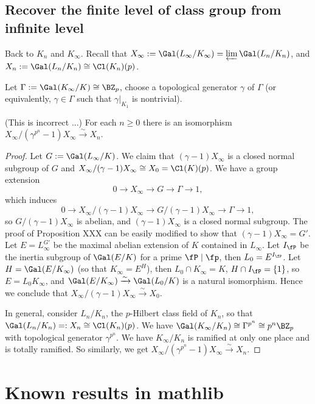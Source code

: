 \subsection{Recover the finite level of class group from infinite level}

Back to $K_n$ and $K_\infty$.
Recall that $X_\infty:=\Gal(L_\infty/K_\infty)=\varprojlim\Gal(L_n/K_n)$,
and $X_n:=\Gal(L_n/K_n)\cong\Cl(K_n)(p)$.

Let $\Gamma:=\Gal(K_\infty/K)\cong\BZ_p$, choose a topological
generator $\gamma$ of $\Gamma$ (or equivalently, $\gamma\in\Gamma$
such that $\gamma|_{K_1}$ is nontrivial).

\begin{prop}
\label{X-inf-coinv-is-X-n}
(This is incorrect ...)
For each $n\geq 0$ there is an isomorphism
$X_\infty/(\gamma^{p^n}-1)X_\infty\xrightarrow\sim
X_n$.
\end{prop}

\begin{proof}
Let $G:=\Gal(L_\infty/K)$.
We claim that $(\gamma-1)X_\infty$ is a closed normal subgroup of $G$
and $X_\infty/(\gamma-1)X_\infty\cong X_0=\Cl(K)(p)$. We have a group extension
$$
0\to X_\infty\to G\to\Gamma\to 1,
$$
which induces
$$
0\to X_\infty/(\gamma-1)X_\infty\to G/(\gamma-1)X_\infty\to\Gamma\to 1,
$$
so $G/(\gamma-1)X_\infty$ is abelian, and $(\gamma-1)X_\infty$
is a closed normal subgroup.
The proof of Proposition XXX can be easily modified to
show that $(\gamma-1)X_\infty=G'$.
Let $E=L_\infty^{G'}$ be the maximal abelian extension
of $K$ contained in $L_\infty$. Let $I_\fP$ be the inertia
subgroup of $\Gal(E/K)$ for a prime $\fP\mid\fp$,
then $L_0=E^{I_\fP}$. Let $H=\Gal(E/K_\infty)$
(so that $K_\infty=E^H$), then $L_0\cap K_\infty=K$,
$H\cap I_\fP=\{1\}$, so $E=L_0K_\infty$,
and $\Gal(E/K_\infty)\xrightarrow\sim\Gal(L_0/K)$
is a natural isomorphism.
Hence we conclude that $X_\infty/(\gamma-1)X_\infty\xrightarrow\sim X_0$.

In general, consider $L_n/K_n$, the $p$-Hilbert class field of $K_n$,
so that $\Gal(L_n/K_n)=:X_n\cong\Cl(K_n)(p)$.
We have $\Gal(K_\infty/K_n)\cong\Gamma^{p^n}\cong p^n\BZ_p$
with topological generator $\gamma^{p^n}$.
We have $K_\infty/K_n$ is ramified at only one place and is
totally ramified. So similarly, we get $X_\infty/(\gamma^{p^n}-1)X_\infty\xrightarrow\sim
X_n$.
\end{proof}
\fi

\appendix

\section{Known results in mathlib}

